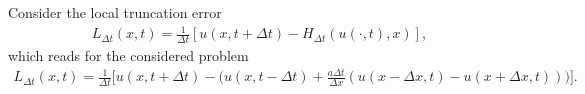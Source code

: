\documentclass[12pt]{article}
\begin{document}
Consider the local truncation error
\begin{align*}
	L_{\Delta t} (x,t) = \frac{1}{\Delta t} \left[ u(x, t + \Delta t) - H_{\Delta t} (u(\cdot,t),x) \right],
\end{align*}
which reads for the considered problem
\begin{align*}
	L_{\Delta t} (x,t) = \frac{1}{\Delta t} \Big[ u(x, t + \Delta t)  - \Big(u(x,t-\Delta t) + \frac{a \Delta t}{\Delta x} \left( u(x-\Delta x,t) - u(x+\Delta x,t) \right) \Big) \Big].
\end{align*}
\end{document}
